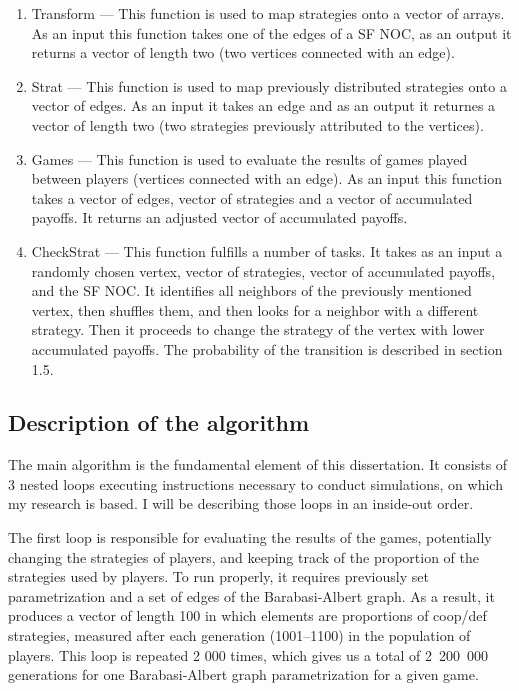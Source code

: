 \documentclass[english, twoside, 12pt, a4paper]{article}
\theoremstyle{definition}
\theoremstyle{plain}
\theoremstyle{remark}
\begin{document}
\begin{enumerate}
  \item Transform --- This function is used to map strategies onto a vector of arrays. As an input this function takes one of the edges of a SF NOC,
   as an output it returns a vector of length two (two vertices connected with an edge).
  \item Strat --- This function is used to map previously distributed strategies onto a vector of edges. As an input it takes an edge and as an output
   it returnes a vector of length two (two strategies previously attributed to the vertices).
  \item Games --- This function is used to evaluate the results of games played between players (vertices connected with an edge). As an input this function
   takes a vector of edges, vector of strategies and a vector of accumulated payoffs. It returns an adjusted vector of accumulated payoffs.
  \item CheckStrat --- This function fulfills a number of tasks. It takes as an input a randomly chosen vertex, vector of strategies, vector of accumulated
  payoffs, and the SF NOC. It identifies all neighbors of the previously mentioned vertex, then shuffles them, and then looks for a neighbor
  with a different strategy. Then it proceeds to change the strategy of the vertex with lower accumulated payoffs. The probability of the transition 
  is described in section 1.5. 
\end{enumerate}

\subsection{Description of the algorithm}

The main algorithm is the fundamental element of this dissertation. It consists of 3 nested loops executing instructions necessary to conduct simulations, on which my research is based. I will be describing those loops in an inside-out order. 

The first loop is responsible for evaluating the results of the games, potentially changing the strategies of players, and keeping track of the proportion of the strategies used by players. To run properly, it requires previously set parametrization and a set of edges of the Barabasi-Albert graph. As a result, it produces a vector of length 100 in which elements are proportions of coop/def strategies, measured after each generation (1001--1100) in the population of players. This loop is repeated 2 000 times, which gives us a total of 2~200~000 generations for one Barabasi-Albert graph parametrization for a given game.
\end{document}
